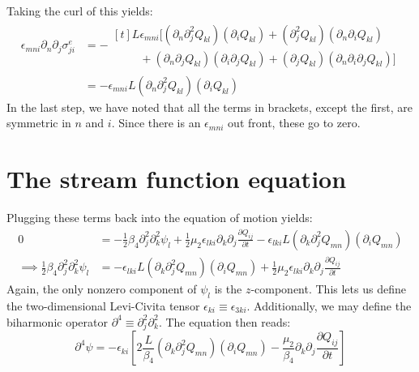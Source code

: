 \documentclass[reqno]{article}
\begin{document}
Taking the curl of this yields:
\begin{equation}
\begin{split}
	\epsilon_{mni} \partial_n \partial_j \sigma^e_{ji}
	&= 
	- \begin{multlined}[t]
	L \epsilon_{mni} \biggl[
	\left( \partial_n \partial_j^2 Q_{kl} \right) \left( \partial_i Q_{kl} \right)
	+ \left( \partial_j^2 Q_{kl} \right) \left( \partial_n \partial_i Q_{kl} \right) \\
	\hspace{1cm} + \left( \partial_n \partial_j Q_{kl} \right) \left( \partial_i \partial_j Q_{kl} \right)
	+ \left( \partial_j Q_{kl} \right) \left( \partial_n \partial_i \partial_j Q_{kl} \right)
	\biggr]
	\end{multlined} \\
	&= - \epsilon_{mni} L \left( \partial_n \partial_j^2 Q_{kl} \right)
	\left( \partial_i Q_{kl} \right)
\end{split}
\end{equation}
In the last step, we have noted that all the terms in brackets, except the first, are symmetric in $n$ and $i$.
Since there is an $\epsilon_{mni}$ out front, these go to zero.

\section{The stream function equation}
Plugging these terms back into the equation of motion yields:
\begin{equation}
\begin{split}
	0 &= -\tfrac12 \beta_4 \partial_j^2 \partial_k^2 \psi_l
	+ \tfrac12 \mu_2 \epsilon_{lki} \partial_k \partial_j \frac{\partial Q_{ij}}{\partial t}
	- \epsilon_{lki} L \left( \partial_k \partial_j^2 Q_{mn} \right) \left( \partial_i Q_{mn} \right) \\
	\implies \tfrac12 \beta_4 \partial_j^2 \partial_k^2 \psi_l
	&= -\epsilon_{lki} L \left( \partial_k \partial_j^2 Q_{mn} \right)
	\left( \partial_i Q_{mn} \right)
	+ \tfrac12 \mu_2 \epsilon_{lki} \partial_k \partial_j \frac{\partial Q_{ij}}{\partial t}
\end{split}
\end{equation}
Again, the only nonzero component of $\psi_l$ is the $z$-component.
This lets us define the two-dimensional Levi-Civita tensor $\epsilon_{ki} \equiv \epsilon_{3ki}$.
Additionally, we may define the biharmonic operator $\partial^4 \equiv \partial_j^2 \partial_k^2$. The equation then reads:
\begin{equation}
	\partial^4 \psi = -\epsilon_{ki} \left[
	2 \frac{L}{\beta_4} \left( \partial_k \partial_j^2 Q_{mn} \right)
	\left( \partial_i Q_{mn} \right)
	- \frac{\mu_2}{\beta_4} \partial_k \partial_j \frac{\partial Q_{ij}}{\partial t}
	\right]
\end{equation}
\end{document}
